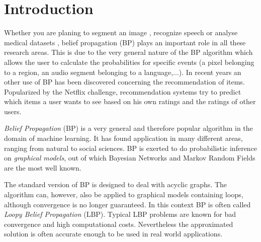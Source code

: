 
\section{Introduction}\label{sec:intro}

Whether you are planing to segment an image \cite{1544822}, recognize speech \cite{5373446} or analyse medical datasets \cite{bailly2011finding}, belief propagation (BP) plays an important role in all these research areas. This is due to the very general nature of the BP algorithm which allows the user to calculate the probabilities for specific events (a pixel belonging to a region, an audio segment belonging to a language,...). In recent years an other use of BP has been discovered concerning the recommendation of items. Popularized by the Netflix challenge, recommendation systems try to predict which items a user wants to see based on his own ratings and the ratings of other users.





\textit{Belief Propagation} (BP) is a very general and therefore popular algorithm in the domain of machine learning. It has found application in many different areas, ranging from natural to social sciences. 
BP is exerted to do probabilistic inference on \textit{graphical models}, out of which Bayesian Networks and Markov Random Fields are the most well known.

The standard version of BP is designed to deal with acyclic graphs. The algorithm can, however, also be applied to graphical models containing loops, although convergence is no longer guaranteed. In this context BP is often called \textit{Loopy Belief Propagation} (LBP). Typical LBP problems are known for bad convergence and high computational costs. Nevertheless the approximated solution is often accurate enough to be used in real world applications.

